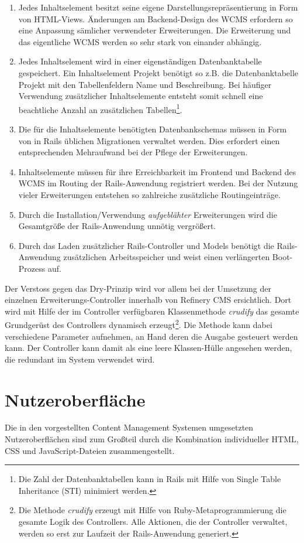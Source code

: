 \begin{enumerate}
\item
Jedes Inhaltselement besitzt seine eigene Darstellungsrepräsentierung in Form von HTML-Views. Änderungen am Backend-Design des WCMS erfordern so eine Anpassung sämlicher verwendeter Erweiterungen. Die Erweiterung und das eigentliche WCMS werden so sehr stark von einander abhängig.
\item
Jedes Inhaltselement wird in einer eigenständigen Datenbanktabelle gespeichert. Ein Inhaltselement Projekt
benötigt so z.B. die Datenbanktabelle Projekt mit den Tabellenfeldern Name und Beschreibung. Bei häufiger Verwendung zusätzlicher Inhaltselemente entsteht somit schnell eine beachtliche Anzahl an zusätzlichen Tabellen\footnote{Die Zahl der Datenbanktabellen kann in Rails mit Hilfe von Single Table Inheritance (STI) minimiert werden.}.
\item
Die für die Inhaltselemente benötigten Datenbankschemas müssen in Form von in Rails üblichen Migrationen verwaltet werden. Dies erfordert einen entsprechenden Mehraufwand bei der Pflege der Erweiterungen.
\item
Inhaltselemente müssen für ihre Erreichbarkeit im Frontend und Backend des WCMS im Routing der Rails-Anwendung registriert werden. Bei der Nutzung vieler Erweiterungen entstehen so zahlreiche zusätzliche Routingeinträge.
\item
Durch die Installation/Verwendung \emph{aufgeblähter} Erweiterungen wird die Gesamtgröße der Rails-Anwendung unnötig vergrößert.
\item
Durch das Laden zusätzlicher Rails-Controller und Models benötigt die Rails-Anwendung zusätzlichen Arbeitsspeicher und weist einen verlängerten Boot-Prozess auf.
\end{enumerate}


Der Verstoss gegen das Dry-Prinzip wird vor allem bei der Umsetzung der einzelnen Erweiterungs-Controller innerhalb von Refinery CMS ersichtlich. Dort wird mit Hilfe der im Controller verfügbaren Klassenmethode \emph{crudify} das gesamte Grundgerüst des Controllers dynamisch erzeugt\footnote{Die Methode \emph{crudify} erzeugt mit Hilfe von Ruby-Metaprogrammierung die gesamte Logik des Controllers. Alle Aktionen, die der Controller verwaltet, werden so erst zur Laufzeit der Rails-Anwendung generiert.}. Die Methode kann dabei verschiedene Parameter aufnehmen, an Hand deren die Ausgabe gesteuert werden kann. Der Controller kann damit als eine leere Klassen-Hülle angesehen werden, die redundant im System verwendet wird.





\section{Nutzeroberfläche}


Die in den vorgestellten Content Management Systemen umgesetzten Nutzeroberflächen sind zum Großteil durch die Kombination individueller HTML, CSS und JavaScript-Dateien zusammengestellt.


